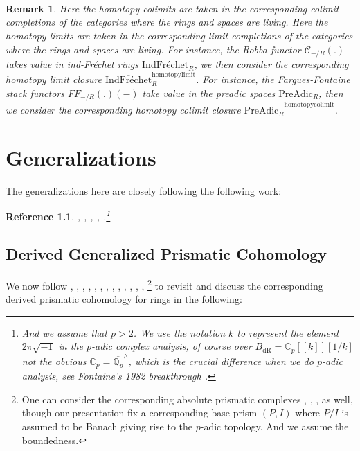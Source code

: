 \documentclass[12pt]{book}
\newtheorem{remark}{Remark}
\newtheorem{reference}{Reference}
\begin{document}
\

\begin{remark}
Here the homotopy colimits are taken in the corresponding colimit completions of the categories where the rings and spaces are living. Here the homotopy limits are taken in the corresponding limit completions of the categories where the rings and spaces are living. For instance, the Robba functor $\widetilde{\mathcal{C}}_{-/R}(.)$ takes value in ind-Fr\'echet rings $\mathrm{Ind}\text{Fr\'echet}_R$, we then consider the corresponding homotopy limit closure $\overline{\mathrm{Ind}\text{Fr\'echet}}^{\mathrm{homotopylimit}}_R$. For instance, the Fargues-Fontaine stack functors ${{FF}}_{-/R}(.)(-)$ take value in the preadic spaces $\mathrm{PreAdic}_R$, then we consider the corresponding homotopy colimit closure $\overline{\mathrm{PreAdic}_R}^{\mathrm{homotopycolimit}}$. 	
\end{remark}





\chapter{Generalizations}

The generalizations here are closely following the following work:

\begin{reference}
\cite{BHS}, \cite{BS}, \cite{BL3}, \cite{BL4}, \cite{Fon2}.\footnote{And we assume that $p>2$. We use the notation $k$ to represent the element $2\pi\sqrt{-1}$ in the $p$-adic complex analysis, of course over $B_\mathrm{dR}=\mathbb{C}_p[[k]][1/k]$ not the obvious $\mathbb{C}_p=\overline{\mathbb{Q}_p}^\wedge$, which is the crucial difference when we do $p$-adic analysis, see Fontaine's 1982 breakthrough \cite{Fon}.}
\end{reference}



\newpage

\section{Derived Generalized Prismatic Cohomology}


We now follow \cite{Grot1}, \cite{Grot2}, \cite{Grot3}, \cite{Grot4}, \cite{BK}, \cite{BBK}, \cite{BBBK}, \cite{BBM}, \cite{KKM}, \cite{T2}, \cite{Sch2}, \cite{BS}, \cite{BL}, \cite{Dr1}\footnote{One can consider the corresponding absolute prismatic complexes \cite{BS}, \cite{BL2}, \cite{BL}, \cite{Dr1} as well, though our presentation fix a corresponding base prism $(P,I)$ where $P/I$ is assumed to be Banach giving rise to the $p$-adic topology. And we assume the boundedness. } to revisit and discuss the corresponding derived prismatic cohomology for rings in the following:
\end{document}
